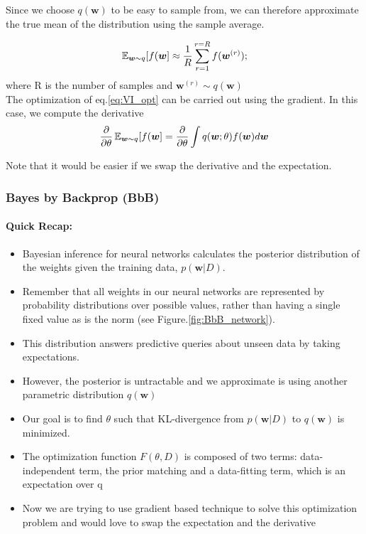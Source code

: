 \documentclass[main]{subfiles}
\begin{document}
Since we choose $q(\bm{w})$ to be easy to sample from, we can therefore approximate the true mean of the distribution using the sample average.

\begin{equation}
    \operatorname{\mathbb{E}}_{\bm{w} \sim q} [f(\bm{w}] \approx \frac{1}{R} \sum_{r=1}^{r=R} f(\bm{w}^{(r)});
\end{equation}
where R is the number of samples and $\bm{w}^{(r)} \sim q(\bm{w})$\\

\noindent
The optimization of eq.\ref{eq:VI_opt} can be carried out using the gradient. In this case, we compute the derivative
\begin{equation}
    \frac{\partial}{\partial \theta} \operatorname{\mathbb{E}}_{\bm{w} \sim q} [f(\bm{w}] = \frac{\partial}{\partial \theta} \int q(\bm{w};\theta) f(\bm{w}) d\bm{w}
\end{equation}

Note that it would be easier if we swap the derivative and the expectation. 

\subsubsection{Bayes by Backprop (BbB)}
\paragraph{Quick Recap:}
\begin{itemize}
    \item Bayesian inference for neural networks calculates the posterior distribution of the weights given the training data, $p(\bm{w}|D)$.
    \item Remember that all weights in our neural networks are represented by probability distributions over possible values, rather than having a single fixed value as is the norm (see Figure.\ref{fig:BbB_network}).
    \item This distribution answers predictive queries about unseen data by taking expectations.
    \item However, the posterior is untractable and we approximate is using another parametric distribution $q(\bm{w})$
    \item Our goal is to find $\theta$ such that KL-divergence from $p(\bm{w}|D)$ to $q(\bm{w})$ is minimized.
    \item The optimization function $F(\theta, D)$ is composed of two terms: data-independent term, the prior matching and a data-fitting term, which is an expectation over q
    \item Now we are trying to use gradient based technique to solve this optimization problem and would love to swap the expectation and the derivative
\end{itemize}
\end{document}
